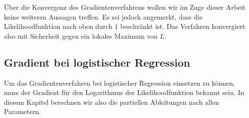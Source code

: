 Über die Konvergenz des Gradientenverfahrens wollen wir im Zuge dieser Arbeit keine weiteren Aussagen treffen. Es sei jedoch angemerkt, dass die Likelihoodfunktion nach oben durch $1$ beschränkt ist. Das Verfahren konvergiert also mit Sicherheit gegen ein lokales Maximum von $L$.

\subsection{Gradient bei logistischer Regression}
\label{subsection:2:2:2}

Um das Gradientenverfahren bei logistischer Regression einsetzen zu können, muss der Gradient für den Logarithmus der Likelihoodfunktion bekannt sein. In diesem Kapitel berechnen wir also die partiellen Ableitungen nach allen Parametern.

